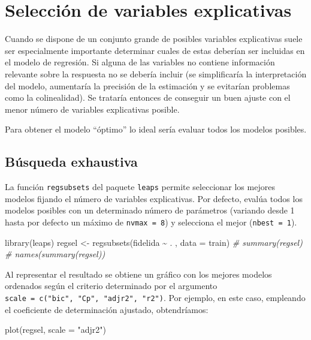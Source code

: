 \documentclass[
  spanish,
]{book}
\newenvironment{Shaded}{\begin{snugshade}}{\end{snugshade}}
\newcommand{\AttributeTok}[1]{\textcolor[rgb]{0.77,0.63,0.00}{#1}}
\newcommand{\CommentTok}[1]{\textcolor[rgb]{0.56,0.35,0.01}{\textit{#1}}}
\newcommand{\FunctionTok}[1]{\textcolor[rgb]{0.00,0.00,0.00}{#1}}
\newcommand{\NormalTok}[1]{#1}
\newcommand{\OtherTok}[1]{\textcolor[rgb]{0.56,0.35,0.01}{#1}}
\newcommand{\SpecialCharTok}[1]{\textcolor[rgb]{0.00,0.00,0.00}{#1}}
\newcommand{\StringTok}[1]{\textcolor[rgb]{0.31,0.60,0.02}{#1}}
\theoremstyle{break}
\theoremstyle{definition}
\theoremstyle{definition}
\theoremstyle{definition}
\theoremstyle{definition}
\theoremstyle{remark}
\begin{document}
\hypertarget{seleccion-reg-lineal}{%
\section{Selección de variables explicativas}\label{seleccion-reg-lineal}}

Cuando se dispone de un conjunto grande de posibles variables explicativas
suele ser especialmente importante determinar cuales de estas deberían ser
incluidas en el modelo de regresión. Si alguna de las variables no contiene
información relevante sobre la respuesta no se debería incluir (se simplificaría
la interpretación del modelo, aumentaría la precisión de la estimación y se
evitarían problemas como la colinealidad). Se trataría entonces de conseguir
un buen ajuste con el menor número de variables explicativas posible.

Para obtener el modelo ``óptimo'' lo ideal sería evaluar todos los modelos posibles.

\hypertarget{buxfasqueda-exhaustiva}{%
\subsection{Búsqueda exhaustiva}\label{buxfasqueda-exhaustiva}}

La función \texttt{regsubsets} del paquete \texttt{leaps} permite seleccionar los mejores modelos
fijando el número de variables explicativas.
Por defecto, evalúa todos los modelos posibles con un determinado número de
parámetros (variando desde 1 hasta por defecto un máximo de \texttt{nvmax\ =\ 8})
y selecciona el mejor (\texttt{nbest\ =\ 1}).

\begin{Shaded}
\begin{Highlighting}[]
\FunctionTok{library}\NormalTok{(leaps)}
\NormalTok{regsel }\OtherTok{\textless{}{-}} \FunctionTok{regsubsets}\NormalTok{(fidelida }\SpecialCharTok{\textasciitilde{}}\NormalTok{ . , }\AttributeTok{data =}\NormalTok{ train)}
\CommentTok{\# summary(regsel)}
\CommentTok{\# names(summary(regsel))}
\end{Highlighting}
\end{Shaded}

Al representar el resultado se obtiene un gráfico con los mejores modelos ordenados
según el criterio determinado por el argumento \texttt{scale\ =\ c("bic",\ "Cp",\ "adjr2",\ "r2")}.
Por ejemplo, en este caso, empleando el coeficiente de determinación ajustado, obtendríamos:

\begin{Shaded}
\begin{Highlighting}[]
\FunctionTok{plot}\NormalTok{(regsel, }\AttributeTok{scale =} \StringTok{"adjr2"}\NormalTok{)}
\end{Highlighting}
\end{Shaded}
\end{document}
